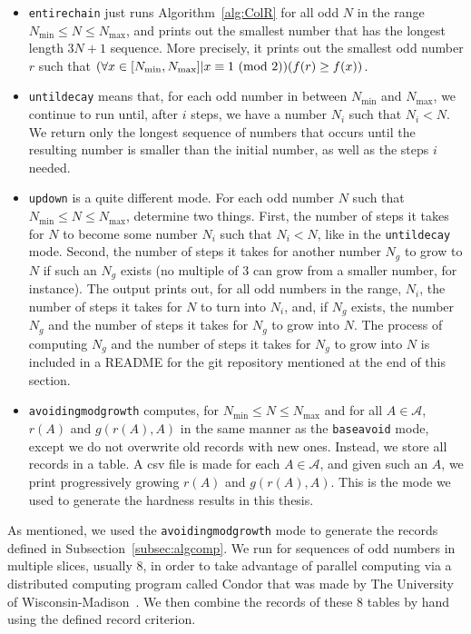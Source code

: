 \begin{itemize}
    \item {\tt entirechain} just runs Algorithm~\ref{alg:ColR} for all odd $N$ in the range $N_{\min} \leq N \leq N_{\max}$, and prints out the smallest number that has the longest length $3N+1$ sequence. More precisely, it prints out the smallest odd number $r$ such that $(\forall x \in [N_{\min},N_{\max}] | x \equiv 1 \ (\mathrm{mod}\ 2)) (f(r) \geq f(x))$.
    \item {\tt untildecay} means that, for each odd number in between $N_{\min}$ and $N_{\max}$, we continue to run until, after $i$ steps, we have a number $N_i$ such that $N_i < N$. We return only the longest sequence of numbers that occurs until the resulting number is smaller than the initial number, as well as the steps $i$ needed.
    \item {\tt updown} is a quite different mode. For each odd number $N$ such that $N_{\min}\leq N \leq N_{\max}$, determine two things. First, the number of steps it takes for $N$ to become some number $N_i$ such that $N_i < N$, like in the {\tt untildecay} mode. Second, the number of steps it takes for another number $N_g$ to grow to $N$ if such an $N_g$ exists (no multiple of 3 can grow from a smaller number, for instance). The output prints out, for all odd numbers in the range, $N_i$, the number of steps it takes for $N$ to turn into $N_i$, and, if $N_g$ exists, the number $N_g$ and the number of steps it takes for $N_g$ to grow into $N$. The process of computing $N_g$ and the number of steps it takes for $N_g$ to grow into $N$ is included in a README for the git repository mentioned at the end of this section.
    \item {\tt avoidingmodgrowth} computes, for $N_{\min}\leq N \leq N_{\max}$ and for all $A \in \mathcal{A}$, $r(A)$ and $g(r(A),A)$ in the same manner as the {\tt baseavoid} mode, except we do not overwrite old records with new ones. Instead, we store all records in a table. A csv file is made for each $A \in \mathcal{A}$, and given such an $A$, we print progressively growing $r(A)$ and $g(r(A),A)$. This is the mode we used to generate the hardness results in this thesis.
\end{itemize}
As mentioned, we used the {\tt avoidingmodgrowth} mode to generate the records defined in Subsection~\ref{subsec:algcomp}. We run for sequences of odd numbers in multiple slices, usually 8, in order to take advantage of parallel computing via a distributed computing program called Condor that was made by The University of Wisconsin-Madison~\cite{Thain:2005:DCP:1064323.1064336}. We then combine the records of these 8 tables by hand using the defined record criterion. \par
